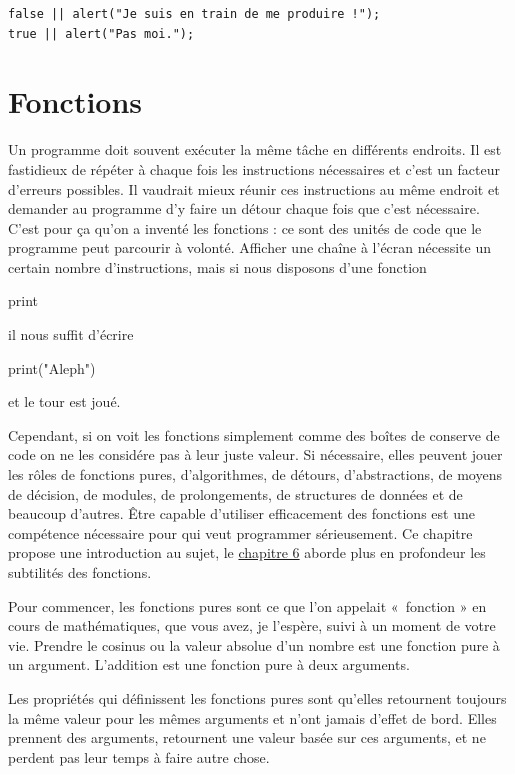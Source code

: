 \documentclass{FramateX}
\renewcommand{\texttt}[1]{\begin{sffamily}{#1}\end{sffamily}}
\begin{document}
\begin{lstlisting}
false || alert("Je suis en train de me produire !");
true || alert("Pas moi.");
\end{lstlisting}

\chapter{Fonctions}

Un programme doit souvent exécuter la même tâche en différents endroits.
Il est fastidieux de répéter à chaque fois les instructions nécessaires
et c'est un facteur d'erreurs possibles. Il vaudrait mieux réunir ces
instructions au même endroit et demander au programme d'y faire un
détour chaque fois que c'est nécessaire. C'est pour ça qu'on a inventé
les fonctions : ce sont des unités de code que le programme peut
parcourir à volonté. Afficher une chaîne à l'écran nécessite un certain
nombre d'instructions, mais si nous disposons d'une fonction
\texttt{print} il nous suffit d'écrire \texttt{print("Aleph")} et le
tour est joué.

Cependant, si on voit les fonctions simplement comme des boîtes de
conserve de code on ne les considére pas à leur juste valeur. Si
nécessaire, elles peuvent jouer les rôles de fonctions pures,
d'algorithmes, de détours, d'abstractions, de moyens de décision, de
modules, de prolongements, de structures de données et de beaucoup
d'autres. Être capable d'utiliser efficacement des fonctions est une
compétence nécessaire pour qui veut programmer sérieusement. Ce chapitre
propose une introduction au sujet, le \href{chapter6.html}{chapitre 6}
aborde plus en profondeur les subtilités des fonctions.

\begin{center}\end{center}

Pour commencer, les fonctions pures sont ce que l'on appelait «~fonction
» en cours de mathématiques, que vous avez, je l'espère, suivi à un
moment de votre vie. Prendre le cosinus ou la valeur absolue d'un nombre
est une fonction pure à un argument. L'addition est une fonction pure à
deux arguments.

Les propriétés qui définissent les fonctions pures sont qu'elles
retournent toujours la même valeur pour les mêmes arguments et n'ont
jamais d'effet de bord. Elles prennent des arguments, retournent une
valeur basée sur ces arguments, et ne perdent pas leur temps à faire
autre chose.
\end{document}
